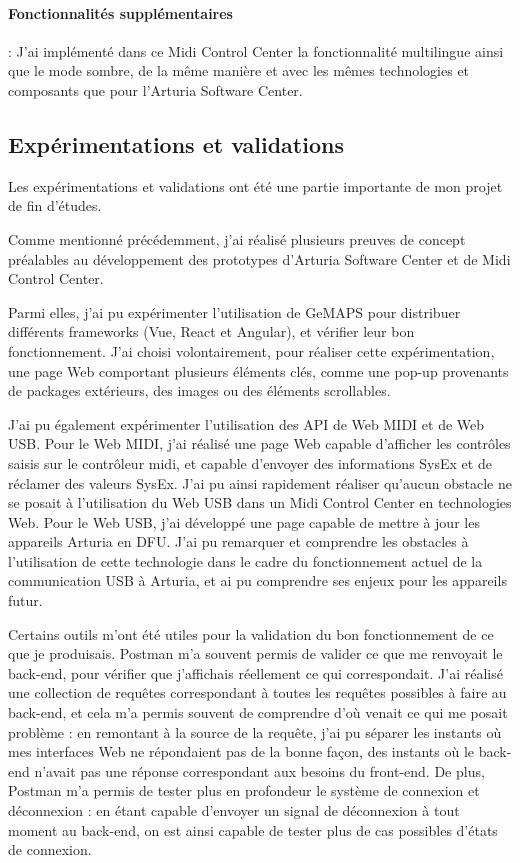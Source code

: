 \documentclass[francais]{rapportPFE}  %
\begin{document}
\paragraph{Fonctionnalités supplémentaires}:
J'ai implémenté dans ce Midi Control Center la fonctionnalité multilingue ainsi que le mode sombre, de la même manière et avec les mêmes technologies et composants que pour l'Arturia Software Center.

\subsection{Expérimentations et validations}

Les expérimentations et validations ont été une partie importante de mon projet de fin d'études.

Comme mentionné précédemment, j'ai réalisé plusieurs preuves de concept préalables au développement des prototypes d'Arturia Software Center et de Midi Control Center.

Parmi elles, j'ai pu expérimenter l'utilisation de GeMAPS pour distribuer différents frameworks (Vue, React et Angular), et vérifier leur bon fonctionnement. J'ai choisi volontairement, pour réaliser cette expérimentation, une page Web comportant plusieurs éléments clés, comme une pop-up provenants de packages extérieurs, des images ou des éléments scrollables.

J'ai pu également expérimenter l'utilisation des API de Web MIDI et de Web USB.
Pour le Web MIDI, j'ai réalisé une page Web capable d'afficher les contrôles saisis sur le contrôleur midi, et capable d'envoyer des informations SysEx et de réclamer des valeurs SysEx. J'ai pu ainsi rapidement réaliser qu'aucun obstacle ne se posait à l'utilisation du Web USB dans un Midi Control Center en technologies Web.
Pour le Web USB, j'ai développé une page capable de mettre à jour les appareils Arturia en DFU. J'ai pu remarquer et comprendre les obstacles à l'utilisation de cette technologie dans le cadre du fonctionnement actuel de la communication USB à Arturia, et ai pu comprendre ses enjeux pour les appareils futur.

Certains outils m'ont été utiles pour la validation du bon fonctionnement de ce que je produisais. Postman m'a souvent permis de valider ce que me renvoyait le back-end, pour vérifier que j'affichais réellement ce qui correspondait. J'ai réalisé une collection de requêtes correspondant à toutes les requêtes possibles à faire au back-end, et cela m'a permis souvent de comprendre d'où venait ce qui me posait problème : en remontant à la source de la requête, j'ai pu séparer les instants où mes interfaces Web ne répondaient pas de la bonne façon, des instants où le back-end n'avait pas une réponse correspondant aux besoins du front-end. De plus, Postman m'a permis de tester plus en profondeur le système de connexion et déconnexion : en étant capable d'envoyer un signal de déconnexion à tout moment au back-end, on est ainsi capable de tester plus de cas possibles d'états de connexion.
\end{document}
